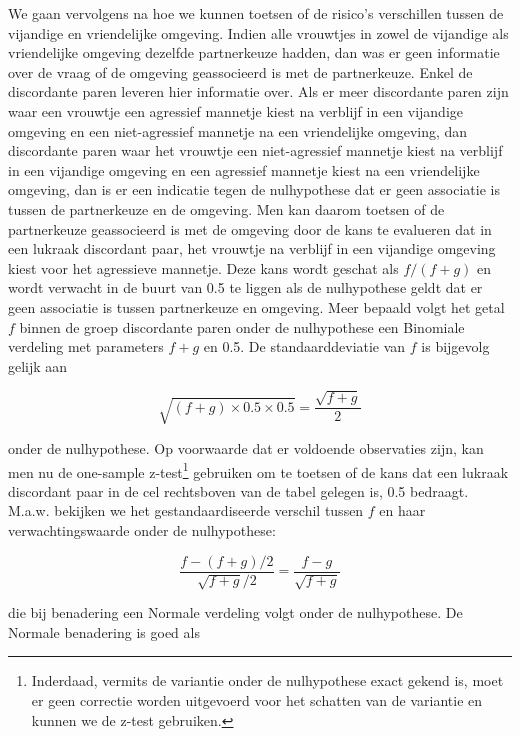 \documentclass[
  dutch,
  letterpaper,
  12pt]{book}
\theoremstyle{definition}
\theoremstyle{definition}
\theoremstyle{definition}
\theoremstyle{remark}
\begin{document}
We gaan vervolgens na hoe we kunnen toetsen of de risico's verschillen
tussen de vijandige en vriendelijke omgeving. Indien alle vrouwtjes in
zowel de vijandige als vriendelijke omgeving dezelfde partnerkeuze
hadden, dan was er geen informatie over de vraag of de omgeving
geassocieerd is met de partnerkeuze. Enkel de discordante paren leveren
hier informatie over. Als er meer discordante paren zijn waar een
vrouwtje een agressief mannetje kiest na verblijf in een vijandige
omgeving en een niet-agressief mannetje na een vriendelijke omgeving,
dan discordante paren waar het vrouwtje een niet-agressief mannetje
kiest na verblijf in een vijandige omgeving en een agressief mannetje
kiest na een vriendelijke omgeving, dan is er een indicatie tegen de
nulhypothese dat er geen associatie is tussen de partnerkeuze en de
omgeving. Men kan daarom toetsen of de partnerkeuze geassocieerd is met
de omgeving door de kans te evalueren dat in een lukraak discordant
paar, het vrouwtje na verblijf in een vijandige omgeving kiest voor het
agressieve mannetje. Deze kans wordt geschat als \(f/(f+g)\) en wordt
verwacht in de buurt van 0.5 te liggen als de nulhypothese geldt dat er
geen associatie is tussen partnerkeuze en omgeving. Meer bepaald volgt
het getal \(f\) binnen de groep discordante paren onder de nulhypothese
een Binomiale verdeling met parameters \(f+g\) en 0.5. De
standaarddeviatie van \(f\) is bijgevolg gelijk aan

\begin{equation*}
\sqrt{(f+g)\times 0.5\times 0.5}=\frac{\sqrt{f+g}}{2}
\end{equation*}

onder de nulhypothese. Op voorwaarde dat er voldoende observaties zijn,
kan men nu de one-sample z-test\footnote{Inderdaad, vermits de variantie
  onder de nulhypothese exact gekend is, moet er geen correctie worden
  uitgevoerd voor het schatten van de variantie en kunnen we de z-test
  gebruiken.} gebruiken om te toetsen of de kans dat een lukraak
discordant paar in de cel rechtsboven van de tabel gelegen is, 0.5
bedraagt. M.a.w. bekijken we het gestandaardiseerde verschil tussen
\(f\) en haar verwachtingswaarde onder de nulhypothese:

\begin{equation*}
\frac{f-(f+g)/2}{\sqrt{f+g}/2}=\frac{f-g}{\sqrt{f+g}}
\end{equation*}

die bij benadering een Normale verdeling volgt onder de nulhypothese. De
Normale benadering is goed als
\end{document}
